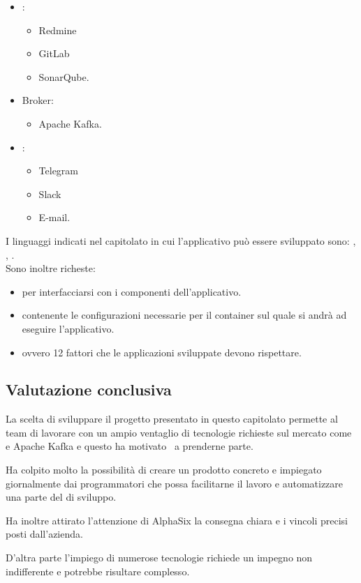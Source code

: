     \begin{itemize}
        \item {}:
        \begin{itemize}
            \item Redmine
            \item GitLab
            \item SonarQube.
        \end{itemize}
        \item Broker:
        \begin{itemize}
            \item Apache Kafka.
        \end{itemize}
        \item {}:
        \begin{itemize}
            \item Telegram
            \item Slack
            \item E-mail.
        \end{itemize}
    \end{itemize}
    I linguaggi indicati nel capitolato in cui l'applicativo può essere sviluppato sono: , , .\\
    Sono inoltre richeste:
    \begin{itemize}
        \item {} per interfacciarsi con i componenti dell'applicativo.
        \item {} contenente le configurazioni necessarie per il container sul quale si andrà ad eseguire l'applicativo.
        \item {} ovvero 12 fattori che le applicazioni sviluppate devono rispettare.
    \end{itemize}

    \subsection{Valutazione conclusiva}
    La scelta di sviluppare il progetto presentato in questo capitolato permette al team di lavorare con un ampio ventaglio di tecnologie
    richieste sul mercato come  e Apache Kafka e questo ha motivato \gruppo\ a prenderne parte.\par
    Ha colpito molto la possibilità di creare un prodotto concreto e impiegato giornalmente dai programmatori che possa facilitarne il lavoro
    e automatizzare una parte del  di sviluppo.\par
    Ha inoltre attirato l'attenzione di AlphaSix la consegna chiara e i vincoli precisi posti dall'azienda.\par
    D'altra parte l'impiego di numerose tecnologie richiede un impegno non indifferente e potrebbe risultare complesso.
